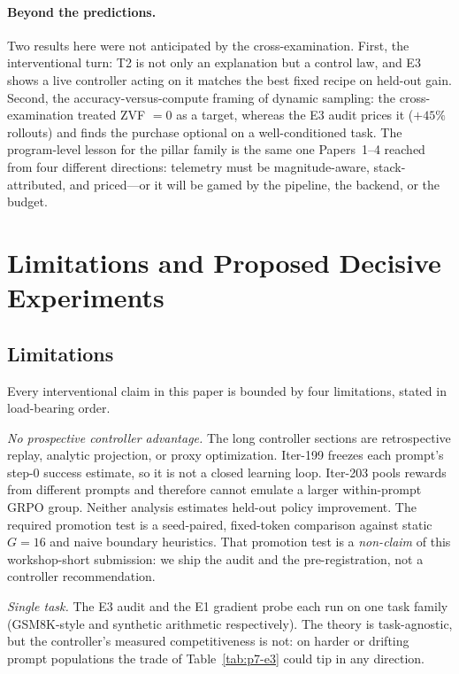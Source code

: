 \documentclass{article}
\begin{document}
\paragraph{Beyond the predictions.} Two results here were not anticipated
by the cross-examination. First, the interventional turn: T2 is not only an
explanation but a control law, and E3 shows a live controller acting on it
matches the best fixed recipe on held-out gain. Second, the
accuracy-versus-compute framing of dynamic sampling: the cross-examination
treated ZVF $= 0$ as a target, whereas the E3 audit prices it ($+45\%$
rollouts) and finds the purchase optional on a well-conditioned task. The
program-level lesson for the pillar family is the same one Papers~1--4
reached from four different directions: telemetry must be
magnitude-aware, stack-attributed, and priced---or it will be gamed by the
pipeline, the backend, or the budget.
 \section{Limitations and Proposed Decisive Experiments}
\label{sec:p7-limitations}

\subsection{Limitations}
\label{sec:p7-limitations-list}
Every interventional claim in this paper is bounded by four limitations,
stated in load-bearing order.

\emph{No prospective controller advantage.} The long controller sections are
retrospective replay, analytic projection, or proxy optimization. Iter-199
freezes each prompt's step-0 success estimate, so it is not a closed learning
loop. Iter-203 pools rewards from different prompts and therefore cannot emulate
a larger within-prompt GRPO group. Neither analysis estimates held-out policy
improvement. The required promotion test is a seed-paired, fixed-token comparison
against static $G{=}16$ and naive boundary heuristics.
That promotion test is a \emph{non-claim} of this workshop-short submission:
we ship the audit and the pre-registration, not a controller recommendation.

\emph{Single task.} The E3 audit and the E1 gradient probe each run on one
task family (GSM8K-style and synthetic arithmetic respectively). The theory
is task-agnostic, but the controller's measured competitiveness is not: on
harder or drifting prompt populations the trade of
Table~\ref{tab:p7-e3} could tip in any direction.
\end{document}
